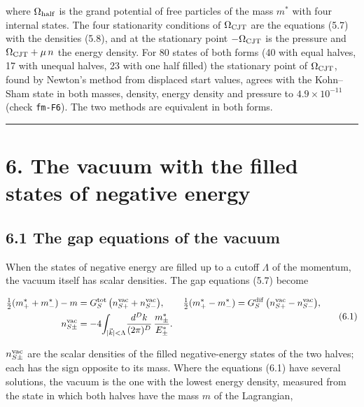 \documentclass[
  10pt,
]{article}
\begin{document}
where \(\Omega_{\rm half}\) is the grand potential of free particles of
the mass \(m^*\) with four internal states. The four stationarity
conditions of \(\Omega_{\rm CJT}\) are the equations (5.7) with the
densities (5.8), and at the stationary point \(-\Omega_{\rm CJT}\) is
the pressure and \(\Omega_{\rm CJT}+\mu\,n\) the energy density. For 80
states of both forms (40 with equal halves, 17 with unequal halves, 23
with one half filled) the stationary point of \(\Omega_{\rm CJT}\),
found by Newton's method from displaced start values, agrees with the
Kohn--Sham state in both masses, density, energy density and pressure to
\(4.9\times10^{-11}\) (check \texttt{fm-F6}). The two methods are
equivalent in both forms.

\begin{center}\rule{0.5\linewidth}{0.5pt}\end{center}

\hypertarget{the-vacuum-with-the-filled-states-of-negative-energy}{%
\section{6. The vacuum with the filled states of negative
energy}\label{the-vacuum-with-the-filled-states-of-negative-energy}}

\hypertarget{the-gap-equations-of-the-vacuum}{%
\subsection{6.1 The gap equations of the
vacuum}\label{the-gap-equations-of-the-vacuum}}

When the states of negative energy are filled up to a cutoff \(\Lambda\)
of the momentum, the vacuum itself has scalar densities. The gap
equations (5.7) become

\[\begin{aligned}
\tfrac12(m^*_++m^*_-)-m&=G_S^{\rm tot}\,\big(n_{S+}^{\rm vac}+n_{S-}^{\rm vac}\big),\qquad
\tfrac12(m^*_+-m^*_-)=G_S^{\rm dif}\,\big(n_{S+}^{\rm vac}-n_{S-}^{\rm vac}\big),\\
n_{S\pm}^{\rm vac}&=-4\!\int_{|\vec k|<\Lambda}\!\frac{d^Dk}{(2\pi)^D}\,\frac{m^*_\pm}{E^*_\pm}.
\end{aligned}\tag{6.1}\]

\(n_{S\pm}^{\rm vac}\) are the scalar densities of the filled
negative-energy states of the two halves; each has the sign opposite to
its mass. Where the equations (6.1) have several solutions, the vacuum
is the one with the lowest energy density, measured from the state in
which both halves have the mass \(m\) of the Lagrangian,
\end{document}
